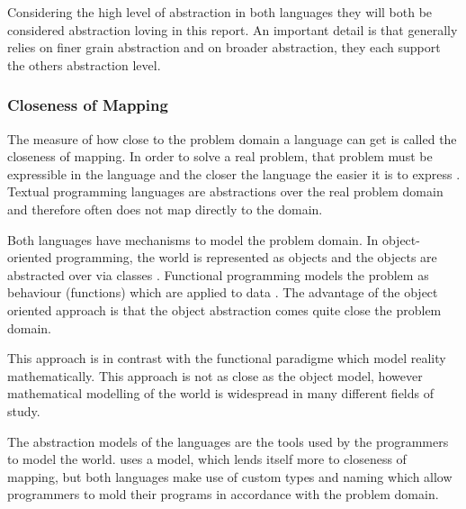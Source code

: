 Considering the high level of abstraction in both languages they will both be considered abstraction loving in this report. An important detail is that \fs generally relies on finer grain abstraction and \cs on broader abstraction, they each support the others abstraction level.

\subsubsection{Closeness of Mapping}
The measure of how close to the problem domain a language can get is called the closeness of mapping. In order to solve a real problem, that problem must be expressible in the language and the closer the language the easier it is to express \cite{green1996usability}. Textual programming languages are abstractions over the real problem domain and therefore often does not map directly to the domain.

Both languages have mechanisms to model the problem domain. In object-oriented programming, the world is represented as objects and the objects are abstracted over via classes \cite{kindler2011object}. Functional programming models the problem as behaviour (functions) which are applied to data \cite{hughes1989functional}. The advantage of the object oriented approach is that the object abstraction comes quite close the problem domain.


This approach is in contrast with the functional paradigme which model reality mathematically. This approach is not as close as the object model, however mathematical modelling of the world is widespread in many different fields of study.


The abstraction models of the languages are the tools used by the programmers to model the world. \cs uses a model, which lends itself more to closeness of mapping, but both languages make use of custom types and naming which allow programmers to mold their programs in accordance with the problem domain.

